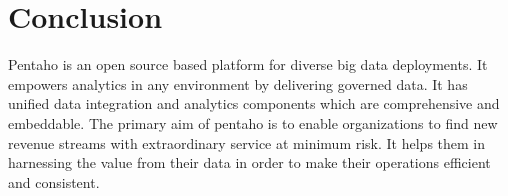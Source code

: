 \documentclass[9pt,twocolumn,twoside]{../../styles/osajnl}
\begin{document}
\section{Conclusion}

Pentaho is an open source based platform for diverse big data
deployments. It empowers analytics in any environment by delivering
governed data. It has unified data integration and analytics
components which are comprehensive and embeddable. The primary aim of
pentaho is to enable organizations to find new revenue streams with
extraordinary service at minimum risk. It helps them in harnessing the
value from their data in order to make their operations efficient and
consistent.




 

\newpage

\appendix
\end{document}
